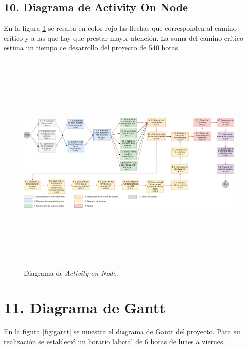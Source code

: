 \documentclass[
11pt, %
]{charter}
\begin{document}
\begin{landscape}
\section{10. Diagrama de Activity On Node}
\label{sec:AoN}

En la figura \ref{fig:DAON} se resalta en color rojo las flechas que corresponden al camino crítico y a las que hay que prestar mayor atención. La suma del camino crítico estima un tiempo de desarrollo del proyecto de 540 horas.

\begin{figure}[htpb]
\centering 
\includegraphics[width=24cm , height=11cm]{./Figuras/DAON.png}
\caption{Diagrama de \textit{Activity on Node}.}
\label{fig:DAON}
\end{figure}

\end{landscape}


\section{11. Diagrama de Gantt}
\label{sec:gantt}

En la figura \ref{fig:gantt} se muestra el diagrama de Gantt del proyecto. Para su realización se estableció un horario laboral de 6 horas de lunes a viernes.
\end{document}
